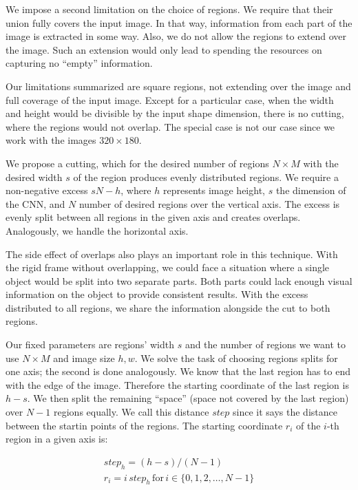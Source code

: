 We impose a second limitation on the choice of regions. We require that their union fully covers the input image. In that way, information from each part of the image is extracted in some way. Also, we do not allow the regions to extend over the image. Such an extension would only lead to spending the resources on capturing no ``empty'' information. 

Our limitations summarized are square regions, not extending over the image and full coverage of the input image. Except for a particular case, when the width and height would be divisible by the input shape dimension, there is no cutting, where the regions would not overlap. The special case is not our case since we work with the images $320 \times 180$.

We propose a cutting, which for the desired number of regions $N \times M$ with the desired width $s$ of the region produces evenly distributed regions. We require a non-negative excess $sN - h$, where $h$ represents image height, $s$ the dimension of the CNN, and $N$ number of desired regions over the vertical axis. The excess is evenly split between all regions in the given axis and creates overlaps. Analogously, we handle the horizontal axis.

The side effect of overlaps also plays an important role in this technique. With the rigid frame without overlapping, we could face a situation where a single object would be split into two separate parts. Both parts could lack enough visual information on the object to provide consistent results. With the excess distributed to all regions, we share the information alongside the cut to both regions.

Our fixed parameters are regions' width $s$ and the number of regions we want to use $N \times M$ and image size $h, w$. We solve the task of choosing regions splits for one axis; the second is done analogously. We know that the last region has to end with the edge of the image. Therefore the starting coordinate of the last region is $h - s$. We then split the remaining ``space'' (space not covered by the last region) over $N-1$ regions equally. We call this distance $step$ since it says the distance between the startin points of the regions. The starting coordinate $r_i$ of the $i$-th region in a given axis is:

\begin{align*}
step_h = (h - s) / (N - 1) \\
r_i = {i \, step_h\,\text{for}\,i \in \{0, 1, 2, \dots, N - 1\}}
\end{align*}

